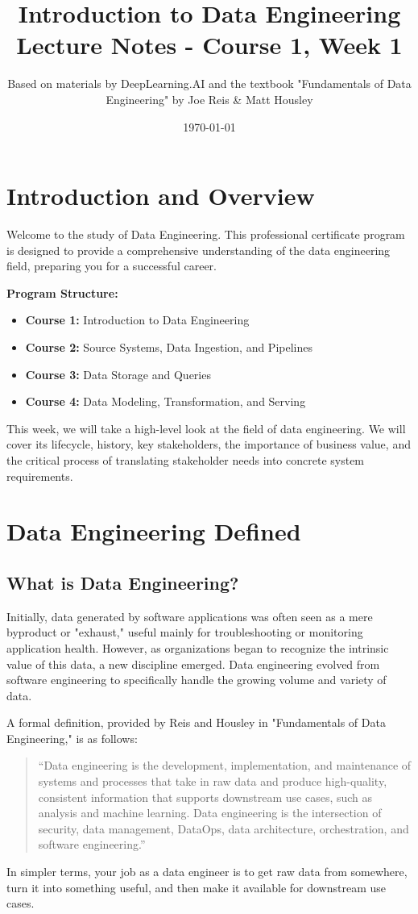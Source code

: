 \documentclass{article}
\title{Introduction to Data Engineering \\ \large{Lecture Notes - Course 1, Week 1}}
\author{Based on materials by DeepLearning.AI and the textbook "Fundamentals of Data Engineering" by Joe Reis & Matt Housley}
\date{\today}
\begin{document}
\maketitle

\section{Introduction and Overview}
Welcome to the study of Data Engineering. This professional certificate program is designed to provide a comprehensive understanding of the data engineering field, preparing you for a successful career.

\textbf{Program Structure:}
\begin{itemize}
    \item \textbf{Course 1:} Introduction to Data Engineering
    \item \textbf{Course 2:} Source Systems, Data Ingestion, and Pipelines
    \item \textbf{Course 3:} Data Storage and Queries
    \item \textbf{Course 4:} Data Modeling, Transformation, and Serving
\end{itemize}

This week, we will take a high-level look at the field of data engineering. We will cover its lifecycle, history, key stakeholders, the importance of business value, and the critical process of translating stakeholder needs into concrete system requirements.

\section{Data Engineering Defined}

\subsection{What is Data Engineering?}
Initially, data generated by software applications was often seen as a mere byproduct or "exhaust," useful mainly for troubleshooting or monitoring application health. However, as organizations began to recognize the intrinsic value of this data, a new discipline emerged. Data engineering evolved from software engineering to specifically handle the growing volume and variety of data.

A formal definition, provided by Reis and Housley in "Fundamentals of Data Engineering," is as follows:
\begin{quote}
    “Data engineering is the development, implementation, and maintenance of systems and processes that take in raw data and produce high-quality, consistent information that supports downstream use cases, such as analysis and machine learning. Data engineering is the intersection of security, data management, DataOps, data architecture, orchestration, and software engineering.”
\end{quote}
In simpler terms, your job as a data engineer is to get raw data from somewhere, turn it into something useful, and then make it available for downstream use cases.
\end{document}
